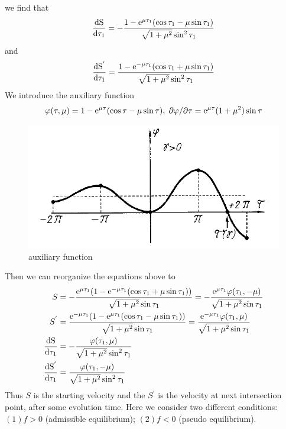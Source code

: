 \documentclass[a4paper,10pt]{article}
\begin{document}
	we find that \[ \frac{\rm d S}{\rm d \tau_1}=-\frac{1-{\rm e}^{\mu \tau_1}(\cos{\tau_1}-\mu\sin{\tau_1})}{\sqrt{1+\mu^2}\sin^2{\tau_1}}
	\] and  \[ \frac{\rm d S^{'}}{\rm d \tau_1}= \frac{1-{\rm e}^{-\mu \tau_1}(\cos{\tau_1}+\mu \sin{\tau_1})}{\sqrt{1+\mu^2}\sin^2{\tau_1}}\]
	We introduce the auxiliary function\cite{ANDRONOV1966443}
	\begin{equation}
	\varphi(\tau,\mu)=1-{\rm e}^{\mu \tau}(\cos{\tau}-\mu\sin{\tau}), \; \partial \varphi/\partial{\tau}={\rm e}^{\mu\tau}(1+\mu^2)\sin{\tau}
	\end{equation}
	\begin{figure}
		\centering
		\includegraphics[width=0.6 \textwidth]{BEB_Explanation/figures/auxiliary_fun.png}
		\caption{auxiliary function}
		\label{fig:auxiliary function}
	\end{figure}
	Then we can reorganize the equations above to
	\begin{subequations} \label{eq: reorganization after aux}
		\begin{align}
		S&=-\frac{{\rm e}^{\mu \tau_1}(1-{\rm e}^{-\mu \tau_1}(\cos{\tau_1}+\mu \sin{\tau_1}))}{\sqrt{1+\mu^2}\sin{\tau_1}} = -\frac{{\rm e}^{\mu \tau_1}\varphi(\tau_1,-\mu)}{\sqrt{1+\mu^2}\sin{\tau_1}}  \label{eq: REO S}\\ 
		S^{'}&=\frac{{\rm e}^{-\mu \tau_1}(1-{\rm e}^{\mu \tau_1}(\cos{\tau_1}-\mu \sin{\tau_1}))}{\sqrt{1+\mu^2}\sin{\tau_1}}=\frac{{\rm e}^{-\mu \tau_1}\varphi(\tau_1,\mu)}{\sqrt{1+\mu^2}\sin{\tau_1}}    \label{eq: REO S'} \\
		\frac{\rm d S}{\rm d \tau_1}&=-\frac{\varphi(\tau_1,\mu)}{\sqrt{1+\mu^2}\sin^2{\tau_1}}  \label{eq：REO dSdt} \\
		\frac{\rm d S^{'}}{\rm d \tau_1}&=\frac{\varphi(\tau_1,-\mu)}{\sqrt{1+\mu^2}\sin^2{\tau_1}} \label{eq: REO dS'dt}
		\end{align}
	\end{subequations}
	Thus $S$ is the starting velocity and the $S^{'}$ is the velocity at next intersection point, after some evolution time. Here we consider two different conditions: $(1)f>0$ (admissible equilibrium); $(2)f<0$ (pseudo equilibrium).
	
\end{document}
